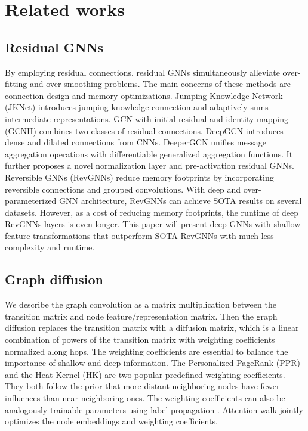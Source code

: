 \documentclass{article}
\begin{document}
\section{Related works}
\subsection{Residual GNNs}
By employing residual connections, residual GNNs simultaneously alleviate over-fitting and over-smoothing problems. The main concerns of these methods are connection design and memory optimizations. Jumping-Knowledge Network (JKNet) \cite{xu2018representation} introduces jumping knowledge connection and adaptively sums intermediate representations. GCN with initial residual and identity mapping (GCNII) \cite{chen2020simple} combines two classes of residual connections. DeepGCN \cite{li2019deepgcns} introduces dense and dilated connections from CNNs. DeeperGCN \cite{li2020deepergcn} unifies message aggregation operations with differentiable generalized aggregation functions. It further proposes a novel normalization layer and pre-activation residual GNNs. Reversible GNNs (RevGNNs) \cite{li2021training} reduce memory footprints by incorporating reversible connections and grouped convolutions. With deep and over-parameterized GNN architecture, RevGNNs can achieve SOTA results on several datasets. However, as a cost of reducing memory footprints, the runtime of deep RevGNNs layers is even longer. This paper will present deep GNNs with shallow feature transformations that outperform SOTA RevGNNs with much less complexity and runtime.

\subsection{Graph diffusion}

We describe the graph convolution as a matrix multiplication between the transition matrix and node feature/representation matrix. Then the graph diffusion \cite{klicpera2018predict,klicpera2019diffusion,page1999pagerank,kondor2002diffusion} replaces the transition matrix with a diffusion matrix, which is a linear combination of powers of the transition matrix with weighting coefficients normalized along hops.
The weighting coefficients are essential to balance the importance of shallow and deep information. The Personalized PageRank (PPR) \cite{page1999pagerank,klicpera2018predict} and the Heat Kernel (HK) \cite{kondor2002diffusion,xu2020graph} are two popular predefined weighting coefficients. They both follow the prior that more distant neighboring nodes have fewer influences than near neighboring ones. The weighting coefficients can also be analogously trainable parameters using label propagation \cite{berberidis2018adaptive, chen2013adaptive}. Attention walk \cite{abu2018watch} jointly optimizes the node embeddings and weighting coefficients. 
\end{document}
